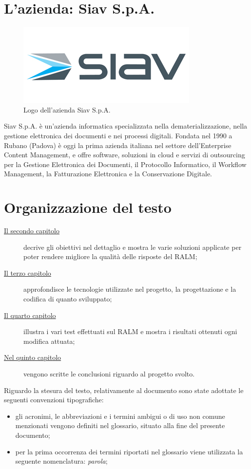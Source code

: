 \section{L'azienda: Siav S.p.A.}

\begin{figure}[!h] 
    \centering 
    \includegraphics[width=0.5\columnwidth]{images/logoSiav.jpg} 
    \caption{Logo dell'azienda Siav S.p.A.}
\end{figure}
Siav S.p.A. è un’azienda informatica specializzata nella dematerializzazione, nella gestione elettronica dei documenti e nei processi digitali.
Fondata nel 1990 a Rubano (Padova) è oggi la prima azienda italiana nel settore dell’Enterprise Content Management, e offre software, soluzioni in cloud e servizi di outsourcing per la Gestione Elettronica dei Documenti, il Protocollo Informatico, il Workflow Management, la Fatturazione Elettronica e la Conservazione Digitale.



\section{Organizzazione del testo}

\begin{description}
    \item[{\hyperref[cap:analisi-preliminare]{Il secondo capitolo}}] decrive gli obiettivi nel dettaglio e mostra le varie soluzioni applicate per poter rendere migliore la qualità delle risposte del RALM;
    
    \item[{\hyperref[cap:progettazione-codifica]{Il terzo capitolo}}] approfondisce le tecnologie utilizzate nel progetto, la progettazione e la codifica di quanto sviluppato;
    
    \item[{\hyperref[cap:verifica-validazione]{Il quarto capitolo}}] illustra i vari test effettuati sul RALM e mostra i risultati ottenuti ogni modifica attuata;
    
    \item[{\hyperref[cap:conclusioni]{Nel quinto capitolo}}] vengono scritte le conclusioni riguardo al progetto svolto.
\end{description}

Riguardo la stesura del testo, relativamente al documento sono state adottate le seguenti convenzioni tipografiche:
\begin{itemize}
	\item gli acronimi, le abbreviazioni e i termini ambigui o di uso non comune menzionati vengono definiti nel glossario, situato alla fine del presente documento; 
	\item per la prima occorrenza dei termini riportati nel glossario viene utilizzata la seguente nomenclatura: \emph{parola}\glsfirstoccur;
\end{itemize}

